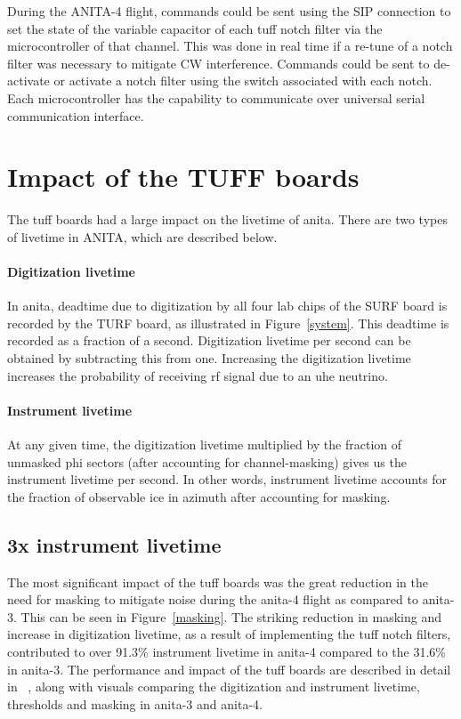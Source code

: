 During the ANITA-4 flight, commands could be sent using the SIP connection to set the 
state of the variable capacitor of each \gls{tuff} notch filter via the microcontroller 
of that channel. 
This was done in real time if a re-tune of a notch filter was necessary to mitigate CW interference.
Commands could be sent to de-activate or activate a notch filter using the switch associated with each notch. 
Each microcontroller has the capability to communicate over universal serial communication interface.


\section{Impact of the TUFF boards}

The \gls{tuff} boards had a large impact on the livetime of \gls{anita}. 
There are two types of livetime in ANITA, which are described below.

\paragraph{Digitization livetime} 

In \gls{anita}, deadtime due to digitization by all four \gls{lab} chips of the SURF board is recorded by 
the TURF board, as illustrated in Figure~\ref{system}. 
This deadtime is recorded as a fraction of a second. Digitization livetime per second can be 
obtained by subtracting this from one. 
Increasing the digitization livetime increases the probability of receiving \gls{rf} signal due to an \gls{uhe} neutrino. 

\paragraph{Instrument livetime} 

At any given time, the digitization livetime multiplied by the fraction of unmasked phi sectors (after accounting for channel-masking) gives us the instrument livetime per second. 
In other words, instrument livetime accounts for the fraction of observable ice in azimuth after accounting for masking. 

\subsection{3x instrument livetime}

The most significant impact of the \gls{tuff} boards was the great reduction in the need for masking to mitigate noise during the \gls{anita}-4 flight as compared to \gls{anita}-3. This can be seen in Figure~\ref{masking}. The striking reduction in masking and increase in digitization livetime, as a result of implementing the \gls{tuff} notch filters, contributed to over 91.3\% instrument livetime in \gls{anita}-4 compared to the 31.6\% in \gls{anita}-3.
The performance and impact of the \gls{tuff} boards are described in detail in ~\cite{tuff}, along with visuals comparing the digitization and instrument livetime, thresholds and masking in \gls{anita}-3 and \gls{anita}-4. 

